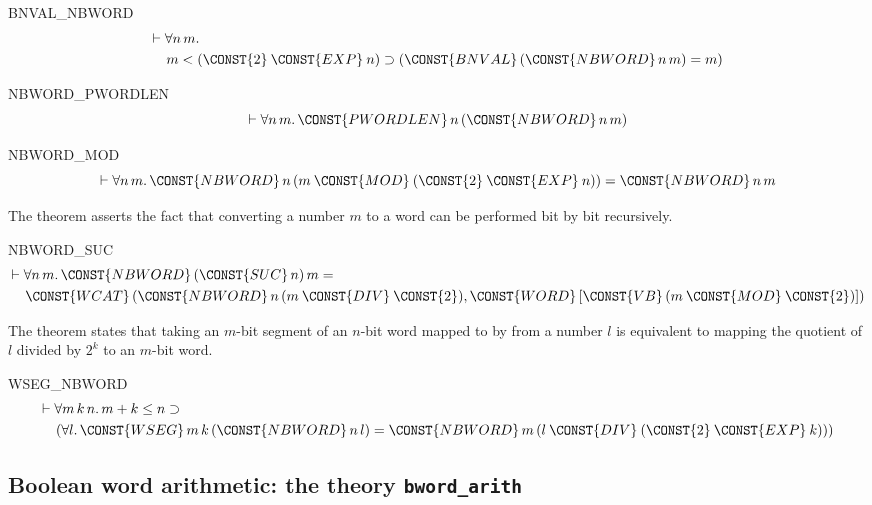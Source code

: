 \begin{holthm}{BNVAL_NBWORD}
\begin{eqnarray*}
\lefteqn{\THM \FORALL n \,m\DOT} \\
 & & m \LES  ( \CONST{2} \:\CONST{EXP}\:n ) \IMP 
           (\CONST{BNVAL} \,(\CONST{NBWORD} \,n \,m) = m)
\end{eqnarray*}
\end{holthm}
\begin{holthm}{NBWORD_PWORDLEN}
\[\THM \FORALL n \,m\DOT \CONST{PWORDLEN}\,n \,(\CONST{NBWORD} \,n \,m)
\]
\end{holthm}
\begin{holthm}{NBWORD_MOD}
\[ \THM \FORALL n \,m\DOT
        \CONST{NBWORD} \,n
           \,(m \:\CONST{MOD}\: ( \CONST{2} \:\CONST{EXP}\: n )) =
           \CONST{NBWORD} \,n \,m \]
\end{holthm}
The theorem  asserts the fact that converting a
number $m$ to a word can be performed bit by bit recursively.
\begin{holthm}{NBWORD_SUC}
\begin{eqnarray*}
\lefteqn{\THM \FORALL n \,m\DOT
        \CONST{NBWORD} \,(\CONST{SUC} \,n) \,m =} \\
 & & \CONST{WCAT}
              \,(\CONST{NBWORD} \,n
                    \,(m \:\CONST{DIV}\: \CONST{2}),
                 \CONST{WORD}
                    \,[\CONST{VB} \,(m \:\CONST{MOD}\: \CONST{2})])
\end{eqnarray*}
\end{holthm}
The theorem  states that taking an $m$-bit segment
of an $n$-bit word mapped to by  from a number $l$ is
equivalent to mapping the quotient of $l$ divided by $2^k$ to an
$m$-bit word.
\begin{holthm}{WSEG_NBWORD}
\begin{eqnarray*}
\lefteqn{\THM \FORALL m \,k \,n\DOT
        m + k \LEE  n \IMP }\\
 & & (\FORALL l\DOT\CONST{WSEG} \,m \,k \,(\CONST{NBWORD} \,n \,l) =
               \CONST{NBWORD} \,m
                  \,(l \:\CONST{DIV}\: ( \CONST{2} \:\CONST{EXP}\: k )))
\end{eqnarray*}
\end{holthm}

\subsection{Boolean word arithmetic: the theory {\tt bword\_arith}}

